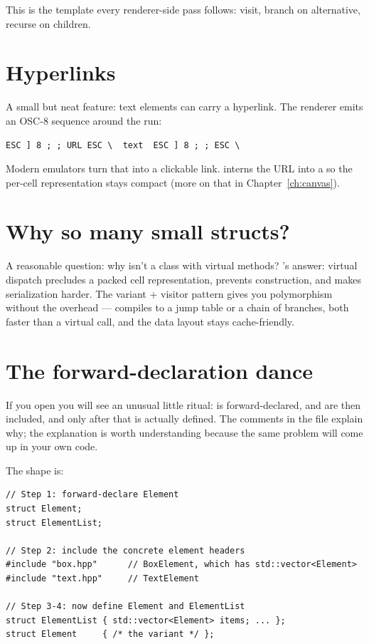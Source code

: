 This is the template every renderer-side pass follows: visit, branch
on alternative, recurse on children.

\section{Hyperlinks}

A small but neat feature: text elements can carry a hyperlink. The
renderer emits an OSC-8 sequence around the run:

\begin{lstlisting}
ESC ] 8 ; ; URL ESC \  text  ESC ] 8 ; ; ESC \
\end{lstlisting}

Modern emulators turn that into a clickable link. \maya{} interns the
URL into a \code{HyperlinkId} so the per-cell representation stays
compact (more on that in Chapter~\ref{ch:canvas}).

\section{Why so many small structs?}

A reasonable question: why isn't  a class with virtual
methods? \maya{}'s answer: virtual dispatch precludes a packed cell
representation, prevents \code{constexpr} construction, and makes
serialization harder. The variant + visitor pattern gives you
polymorphism without the overhead ---  compiles to a
jump table or a chain of branches, both faster than a virtual call,
and the data layout stays cache-friendly.

\section{The forward-declaration dance}
\label{sec:elem:forward-decl}

If you open  you will see
an unusual little ritual:  is forward-declared,
 and  are then included, and only after
that is \code{Element} actually defined. The comments in the file
explain why; the explanation is worth understanding because the same
problem will come up in your own code.

The shape is:

\begin{lstlisting}
// Step 1: forward-declare Element
struct Element;
struct ElementList;

// Step 2: include the concrete element headers
#include "box.hpp"      // BoxElement, which has std::vector<Element>
#include "text.hpp"     // TextElement

// Step 3-4: now define Element and ElementList
struct ElementList { std::vector<Element> items; ... };
struct Element     { /* the variant */ };
\end{lstlisting}

